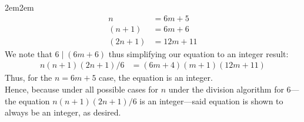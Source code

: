\documentclass[10pt,oneside]{book}
\newcommand{\en}{\vspace{0.25cm}\\}
\let\endoldproof\endproof
\renewenvironment{proof}[1][\proofname]
  {\vspace{0.2cm}\begin{adjustwidth}{2em}{2em}
   \oldproof[#1]}
  {\endoldproof
   \end{adjustwidth}}
\begin{document}
\begin{enumerate}
\begin{proof}
\begin{align*}
			n &= 6m +5\\
			(n+1)&= 6m+6\\
			(2n+1)&= 12m+11
		\end{align*}
		We note that $6\mid (6m+6)$ thus simplifying our equation to an integer result:
		\begin{align*}
			n(n+1)(2n+1)/6 &= (6m+4)(m+1)(12m+11)
		\end{align*}
		Thus, for the $n= 6m+5$ case, the equation is an integer. \en
		Hence, because under all possible cases for $n$ under the division algorithm for 6—the equation $n(n+1)(2n+1)/6$ is an integer—said equation is shown to always be an integer, as desired. 
	\end{proof}
\end{enumerate}
\end{document}
